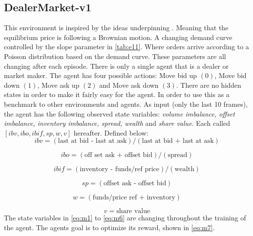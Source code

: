 \documentclass{kththesis}
\theoremstyle{definition}
\begin{document}
\newpage
\subsection{DealerMarket-v1}
This environment is inspired by the ideas underpinning \textcite{ho1981optimal}. Meaning that the equilibrium price is following a Brownian motion.  A changing demand curve controlled by the slope parameter in \autoref{tab:e11}. Where orders arrive according to a Poisson distribution based on the demand curve. These parameters are all changing after each episode.  
\newline
\newline
There is only a single agent that is a dealer or market maker. The agent has four possible actions: Move bid up $(0)$, Move bid down $(1)$, Move ask up $(2)$ and Move ask down $(3)$. There are no hidden states in order to make it fairly easy for the agent. In order to use this as a benchmark to other environments and agents. 
\newline
\newline
As input (only the last 10 frames), the agent has the following observed state variables: \textit{volume imbalance, offset imbalance, inventory imbalance, spread, wealth} and \textit{share value}. 
Each called $[ibv, ibo, ibif,sp, w,v]$ hereafter. Defined below:
\begin{equation}
\label{eq:m1}
    ibv = (\text{last at bid - last at ask})/(\text{last at bid + last at ask})
\end{equation}

\begin{equation}
\label{eq:m2}
    ibo = (\text{off set ask + offset bid})/(\text{spread})
\end{equation}

\begin{equation}
\label{eq:m3}
    ibif = (\text{inventory - funds/ref price})/(\text{wealth})
\end{equation}

\begin{equation}
\label{eq:m4}
    sp = (\text{offset ask - offset bid})
\end{equation}

\begin{equation}
\label{eq:m5}
    w = (\text{funds/price ref + inventory})
\end{equation}

\begin{equation}
\label{eq:m6}
    v = \text{share value}
\end{equation}
The state variables in \autoref{eq:m1} to \autoref{eq:m6} are changing throughout the training of the agent. The agents goal is to optimize its reward, shown in \autoref{eq:m7}. 
\end{document}
